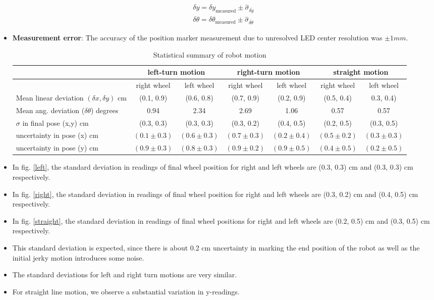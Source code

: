 \begin{itemize}
\begin{align*}
\delta y = \delta y_{\text{measured}} \pm \hat{\sigma}_{\overline{\delta y}} \\
\delta \theta = \delta \theta_{\text{measured}} \pm \hat{\sigma}_{\overline{\delta \theta}}
\end{align*}
\item \textbf{Measurement error}: The accuracy of the position marker measurement due to unresolved LED center resolution was $\pm 1mm$.
\begin{table}[ht]
\centering
\begin{tabular}{| l | c | c | c | c | c | c |}
\hline
 & \multicolumn{2}{c|}{left-turn motion} & \multicolumn{2}{c|}{ right-turn motion} & \multicolumn{2}{c|}{straight motion} \\
\hline
 & right wheel & left wheel & right wheel & left wheel & right wheel & left wheel \\
\hline
Mean linear deviation $(\delta x, \delta y)$ cm & (0.1, 0.9) & (0.6, 0.8)
& (0.7, 0.9) & (0.2, 0.9) & (0.5, 0.4) & 0.3, 0.4) \\
\hline
Mean ang. deviation ($\delta \theta$) degrees & 0.94 & 2.34 & 2.69 & 1.06 & 0.57 & 0.57 \\
\hline
$\sigma$ in final pose (x,y) cm & (0.3, 0.3) & (0.3, 0.3) & (0.3, 0.2) & (0.4, 0.5) & (0.2, 0.5) & (0.3, 0.5)\\
\hline
uncertainty in pose (x) cm & $(0.1 \pm 0.3)$ & $(0.6 \pm 0.3)$ & $(0.7 \pm 0.3)$ & $(0.2 \pm 0.4)$ & $(0.5 \pm 0.2)$ & $(0.3 \pm 0.3)$ \\
uncertainty in pose (y) cm & $(0.9 \pm 0.3)$ & $(0.8 \pm 0.3)$ & $(0.9 \pm 0.2)$ & $(0.9 \pm 0.5)$ & $(0.4 \pm 0.5)$ & $(0.2 \pm 0.5)$ \\
\hline
\end{tabular}
\caption{Statistical summary of robot motion}
\label{stats}
\end{table}

\item In fig. \ref{left}, the standard deviation in readings of final wheel position for right and left wheels are (0.3, 0.3) cm and (0.3, 0.3) cm respectively.
\item In fig. \ref{right}, the standard deviation in readings of final wheel position for right and left wheels are (0.3, 0.2) cm and (0.4, 0.5) cm respectively.
\item In fig. \ref{straight}, the standard deviation in readings of final wheel positions for right and left wheels are (0.2, 0.5) cm and (0.3, 0.5) cm respectively.
\item This standard deviation is expected, since there is about 0.2 cm uncertainty in marking the end position of the robot as well as the initial jerky motion introduces some noise.
\item The standard deviations for left and right turn motions are very similar.
\item For straight line motion, we observe a substantial variation in y-readings.
\end{itemize}

